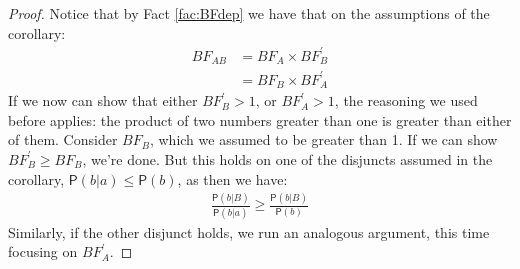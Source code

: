 \documentclass[
  10pt,
  dvipsnames,enabledeprecatedfontcommands]{scrartcl}
\newcommand{\pr}[1]{\ensuremath{\mathsf{P}(#1)}}
\begin{document}
\begin{proof}
Notice that by Fact \ref{fac:BFdep} we have that on the assumptions of the corollary:
\begin{align*}
BF_{AB} & = BF_{A}\times BF^{'}_{B} \\
& = BF_{B} \times BF^{'}_{A}
\end{align*}
If we now can show that either $BF^{'}_{B} > 1$, or $BF^{'}_{A} > 1$, the reasoning we used before applies: the product of two numbers greater than one is greater than either of them.  Consider $BF_{B}$, which we assumed to be greater than 1. If we can show $BF^{'}_{B}\geq BF_{B}$, we're done. But this holds on one of the disjuncts assumed in the corollary, $\pr{b\vert a} \leq \pr{b}$, as then we have:
\begin{align*}
\frac{\pr{b \vert B}}{\pr{b\vert a}} \geq \frac{\pr{b \vert B}}{\pr{b}}
\end{align*}
Similarly, if the other disjunct holds, we run an analogous argument, this time focusing on $BF^{'}_{A}$.
\end{proof}
\end{document}
